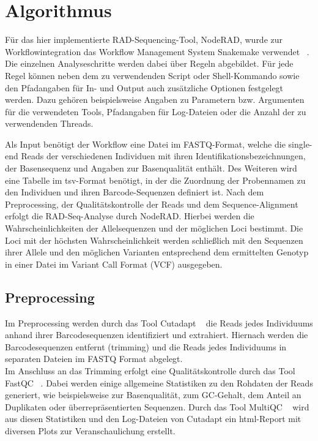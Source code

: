 \chapter{Algorithmus} \label{sec:alg}
Für das hier implementierte RAD-Sequencing-Tool, NodeRAD, wurde zur Workflowintegration das Workflow Management System Snakemake verwendet ~\cite{koester_2012_1, koester_2012_2}. Die einzelnen Analyseschritte werden dabei über Regeln abgebildet. Für jede Regel können neben dem zu verwendenden Script oder Shell-Kommando sowie den Pfadangaben für In- und Output auch zusätzliche Optionen festgelegt werden. Dazu gehören beispielsweise Angaben zu Parametern bzw. Argumenten für die verwendeten Tools, Pfadangaben für Log-Dateien oder die Anzahl der zu verwendenden Threads.

Als Input benötigt der Workflow eine Datei im FASTQ-Format, welche die single-end Reads der verschiedenen Individuen mit ihren Identifikationsbezeichnungen, der Basensequenz und Angaben zur  Basenqualität enthält. Des Weiteren wird eine Tabelle im tsv-Format benötigt, in der die Zuordnung der Probennamen zu den Individuen und ihren Barcode-Sequenzen definiert ist. Nach dem Preprocessing, der Qualitätskontrolle der Reads und dem Sequence-Alignment erfolgt die RAD-Seq-Analyse durch NodeRAD. Hierbei werden die Wahrscheinlichkeiten der Allelsequenzen und der möglichen Loci bestimmt. Die Loci mit der höchsten Wahrscheinlichkeit werden schließlich mit den Sequenzen ihrer Allele und den möglichen Varianten entsprechend dem ermittelten Genotyp in einer Datei im Variant Call Format (VCF) ausgegeben.

\section{Preprocessing} \label{sec:preproc}

Im Preprocessing werden durch das Tool Cutadapt ~\cite{martin_2011} die Reads jedes Individuums anhand ihrer Barcodesequenzen identifiziert und extrahiert. Hiernach werden die Barcodesequenzen entfernt (trimming) und die Reads jedes Individuums in separaten Dateien im FASTQ Format abgelegt. \\
Im Anschluss an das Trimming erfolgt eine Qualitätskontrolle durch das Tool FastQC  ~\cite{andrews_2012}. Dabei werden einige allgemeine Statistiken zu den Rohdaten der Reads generiert, wie beispielsweise zur Basenqualität, zum GC-Gehalt, dem Anteil an Duplikaten oder überrepräsentierten Sequenzen. Durch das Tool MultiQC ~\cite{ewels_2016} wird aus diesen Statistiken und den Log-Dateien von Cutadapt ein html-Report mit diversen Plots zur Veranschaulichung erstellt.

